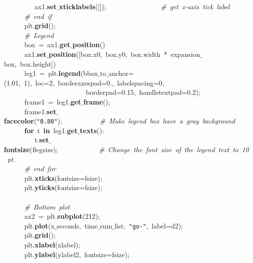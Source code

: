 \mbox{}\ \ \ \ \ \ \ \ \ ax1.\textbf{set$\_$xticklabels}([]);\ \ \ \ \ \ \ \ \ \ \ \ \ \ \ \ \textit{\#\ get\ x-axis\ tick\ label} \\
\mbox{}\ \ \ \ \ \ \textit{\#\ end\ if} \\
\mbox{}\ \ \ \ \ \ plt.\textbf{grid}(); \\
\mbox{}\ \ \ \ \ \ \textit{\#\ Legend} \\
\mbox{}\ \ \ \ \ \ box\ =\ ax1.\textbf{get$\_$position}() \\
\mbox{}\ \ \ \ \ \ ax1.\textbf{set$\_$position}([box.x0,\ box.y0,\ box.width\ *\ expansion$\_$box,\ box.height]) \\
\mbox{}\ \ \ \ \ \ leg1\ =\ plt.\textbf{legend}(bbox$\_$to$\_$anchor=(1.01,\ 1),\ loc=2,\ borderaxespad=0.,\ labelspacing=0,\  \\
\mbox{}\ \ \ \ \ \ \ \ \ \ \ \ \ \ \ \ \ \ \ \ \ \ \ \ borderpad=0.15,\ handletextpad=0.2); \\
\mbox{}\ \ \ \ \ \ frame1\ =\ leg1.\textbf{get$\_$frame}(); \\
\mbox{}\ \ \ \ \ \ frame1.\textbf{set$\_$facecolor}(\texttt{"{}0.80"{}});\ \ \ \ \ \ \ \ \ \ \ \textit{\#\ Make\ legend\ box\ have\ a\ gray\ background} \\
\mbox{}\ \ \ \ \ \ \textbf{for}\ t\ \textbf{in}\ leg1.\textbf{get$\_$texts}(): \\
\mbox{}\ \ \ \ \ \ \ \ \ t.\textbf{set$\_$fontsize}(flegsize);\ \ \ \ \ \ \ \ \ \ \ \ \textit{\#\ Change\ the\ font\ size\ of\ the\ legend\ text\ to\ 10\ pt.} \\
\mbox{}\ \ \ \ \ \ \textit{\#\ end\ for} \\
\mbox{}\ \ \ \ \ \ plt.\textbf{xticks}(fontsize=fsize); \\
\mbox{}\ \ \ \ \ \ plt.\textbf{yticks}(fontsize=fsize); \\
\mbox{}\ \ \ \ \ \  \\
\mbox{}\ \ \ \ \ \ \textit{\#\ Bottom\ plot} \\
\mbox{}\ \ \ \ \ \ ax2\ =\ plt.\textbf{subplot}(212); \\
\mbox{}\ \ \ \ \ \ plt.\textbf{plot}(x$\_$seconds,\ time$\_$sum$\_$list,\ \texttt{"{}go-"{}},\ label=d2); \\
\mbox{}\ \ \ \ \ \ plt.\textbf{grid}(); \\
\mbox{}\ \ \ \ \ \ plt.\textbf{xlabel}(xlabel); \\
\mbox{}\ \ \ \ \ \ plt.\textbf{ylabel}(ylabel2,\ fontsize=fsize); \\
\mbox{}\ \ \ \ \ \  \\
